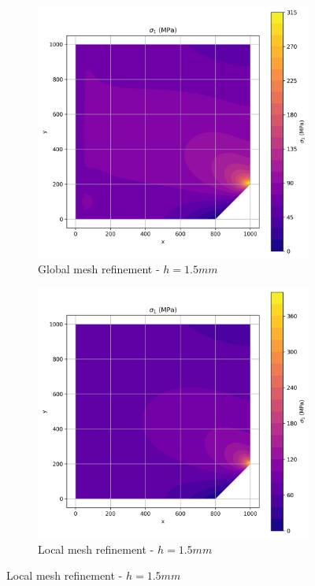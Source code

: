 \begin{figure}[H]
  \centering
  \begin{subfigure}[b]{0.45\textwidth}
    \centering
    \includegraphics[width=\textwidth]{GRAFICOS/Quad9/1.5mm_global/resultados - sigma_1.png}
    \caption{Global mesh refinement - $h=1.5mm$}
    \label{fig:img12}
  \end{subfigure}
  \hfill
  \begin{subfigure}[b]{0.45\textwidth}
    \centering
    \includegraphics[width=\textwidth]{GRAFICOS/Quad9/1.5mm_local/resultados - sigma_1.png}
    \caption{Local mesh refinement - $h=1.5mm$}
    \label{fig:img22}
  \end{subfigure}
\end{figure}

